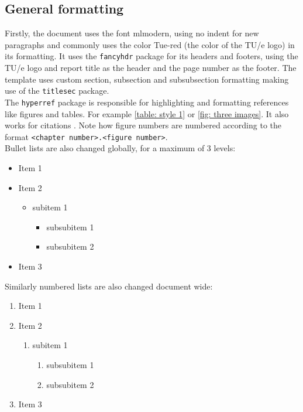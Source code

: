 \subsection{General formatting}
Firstly, the document uses the font mlmodern, using no indent for new paragraphs and commonly uses the color \textcolor{Tue-red}{Tue-red} (the color of the TU/e logo) in its formatting. It uses the \texttt{fancyhdr} package for its headers and footers, using the TU/e logo and report title as the header and the page number as the footer. The template uses custom section, subsection and subsubsection formatting making use of the \texttt{titlesec} package.\\
The \texttt{hyperref} package is responsible for highlighting and formatting references like figures and tables. For example \cref{table: style 1} or \cref{fig: three images}. It also works for citations \cite{texbook}. Note how figure numbers are numbered according to the format \texttt{<chapter number>.<figure number>}.\\

Bullet lists are also changed globally, for a maximum of 3 levels:

\begin{itemize}
    \item Item 1
    \item Item 2
    \begin{itemize}
        \item subitem 1
        \begin{itemize}
            \item subsubitem 1
            \item subsubitem 2
        \end{itemize}
    \end{itemize}
    \item Item 3
\end{itemize}

Similarly numbered lists are also changed document wide:

\begin{enumerate}
    \item Item 1
    \item Item 2
    \begin{enumerate}
        \item subitem 1
        \begin{enumerate}
            \item subsubitem 1
            \item subsubitem 2
        \end{enumerate}
    \end{enumerate}
    \item Item 3
\end{enumerate}

